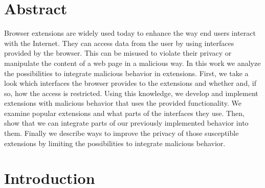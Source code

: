 \documentclass[article,colorback,accentcolor=tud9c,type=bsc]{tudthesis}
\let\stdsection\section
\renewcommand\section{\newpage\stdsection}
\begin{document}
	\author{Arno Manfred Krause}
	
	\newpage

\section{Abstract}

	Browser extensions are widely used today to enhance the way end users interact with the Internet. They can access data from the user by using interfaces provided by the browser. This can be misused to violate their privacy or manipulate the content of a web page in a malicious way. In this work we analyze the possibilities to integrate malicious behavior in extensions. First, we take a look which interfaces the browser provides to the extensions and whether and, if so, how the access is restricted. Using this knowledge, we develop and implement extensions with malicious behavior that uses the provided functionality. We examine popular extensions and what parts of the interfaces they use. Then, show that we can integrate parts of our previously implemented behavior into them. Finally we describe ways to improve the privacy of those susceptible extensions by limiting the possibilities to integrate malicious behavior.	
 
\section{Introduction}
	
\end{document}
